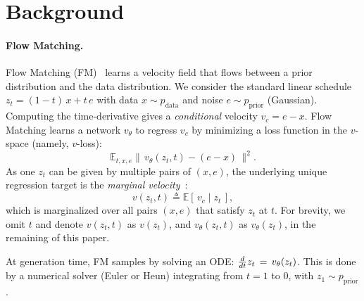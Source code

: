 \section{Background}
\label{sec:background}

\paragraph{Flow Matching.}
Flow Matching (FM)~\cite{fm,rectified,stochasticflow} learns a velocity field that flows between a prior distribution and the data distribution. 
We consider the standard linear schedule $z_t=(1-t)\,x+t\,e$ with data $x\!\sim p_{\text{data}}$ and noise $e\!\sim p_{\text{prior}}$ (\eg Gaussian). 
Computing the time-derivative gives a \emph{conditional} velocity $v_c=e-x$.
Flow Matching learns a network $v_\theta$ to regress $v_c$ by minimizing a loss function in the $v$-space (namely, $v$-loss):
\begin{equation}
\label{eq:fm-loss}
\mathbb{E}_{t,x,e}\big\|\,v_\theta(z_t,t)-(e-x)\,\big\|^2.
\end{equation}
As one $z_t$ can be given by multiple pairs of $(x,e)$, the underlying unique regression target is the \textit{marginal velocity}~\cite{fm}:
\begin{equation}
\label{eq:marginal-v} 
v(z_t,t) \triangleq \mathbb{E}[\,v_c\mid z_t\,], 
\end{equation}
which is marginalized over all pairs $(x,e)$ that satisfy $z_t$ at $t$.
For brevity, we omit $t$ and denote $v(z_t,t)$ as $v(z_t)$, and $v_\theta(z_t,t)$ as $v_\theta(z_t)$, in the remaining of this paper.

At generation time, FM samples by solving an ODE: $\frac{d}{d t}{z_t}\,=\,v_\theta(z_t)$.
This is done by a numerical solver (\eg Euler or Heun) integrating from $t=1$ to $0$, with $z_1\sim p_{\text{prior}}$.

